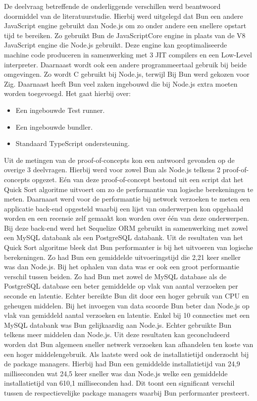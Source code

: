 De deelvraag betreffende de onderliggende verschillen werd beantwoord doormiddel van de literatuurstudie.
Hierbij werd uitgelegd dat Bun een andere JavaScript engine gebruikt dan Node.js om zo onder andere een snellere opstart tijd te bereiken.
Zo gebruikt Bun de JavaScriptCore engine in plaats van de V8 JavaScript engine die Node.js gebruikt.
Deze engine kan geoptimaliseerde machine code produceren in samenwerking met 3 JIT compilers en een Low-Level interpreter.
Daarnaast wordt ook een andere programmeertaal gebruik bij beide omgevingen. Zo wordt C gebruikt bij Node.js, terwijl Bij Bun werd gekozen voor Zig.
Daarnaast heeft Bun veel zaken ingebouwd die bij Node.js extra moeten worden toegevoegd.
Het gaat hierbij over:
\begin{itemize}
    \item Een ingebouwde Test runner.
    \item Een ingebouwde bundler.
    \item Standaard TypeScript ondersteuning.
\end{itemize}
Uit de metingen van de proof-of-concepts kon een antwoord gevonden op de overige 3 deelvragen.
Hierbij werd voor zowel Bun als Node.js telkens 2 proof-of-concepts opgezet. 
Eén van deze proof-of-concept bestond uit een script dat het Quick Sort algoritme uitvoert om zo de performantie van logische berekeningen te meten.
Daarnaast werd voor de performantie bij network verzoeken te meten een applicatie back-end opgesteld waarbij 
een lijst van onderwerpen kon opgehaald worden en een recensie zelf gemaakt kon worden over één van deze onderwerpen.
Bij deze back-end werd het Sequelize ORM gebruikt in samenwerking met zowel een MySQL databank als een PostgreSQL databank.
Uit de resultaten van het Quick Sort algoritme bleek dat Bun performanter is bij het uitvoeren van logische berekeningen.
Zo had Bun een gemiddelde uitvoeringstijd die 2,21 keer sneller was dan Node.js.
Bij het ophalen van data was er ook een groot performantie verschil tussen beiden. Zo had Bun met zowel de MySQL database als de PostgreSQL database 
een beter gemiddelde op vlak van aantal verzoeken per seconde en latentie. Echter bereikte Bun dit door een hoger gebruik van CPU en geheugen middelen.
Bij het invoegen van data scoorde Bun beter dan Node.js op vlak van gemiddeld aantal verzoeken en latentie.
Enkel bij 10 connecties met een MySQL databank was Bun gelijkaardig aan Node.js.
Echter gebruikte Bun telkens meer middelen dan Node.js.
Uit deze resultaten kan geconcludeerd worden dat Bun algemeen sneller netwerk verzoeken kan afhandelen
ten koste van een hoger middelengebruik.
Als laatste werd ook de installatietijd onderzocht bij de package managers. Hierbij had Bun een 
gemiddelde installatietijd van 24,9 milliseconden wat 24,5 keer sneller was dan Node.js welke een gemiddelde installatietijd van 610,1 milliseconden had.
Dit toont een significant verschil tussen de respectievelijke package managers waarbij Bun performanter presteert.

